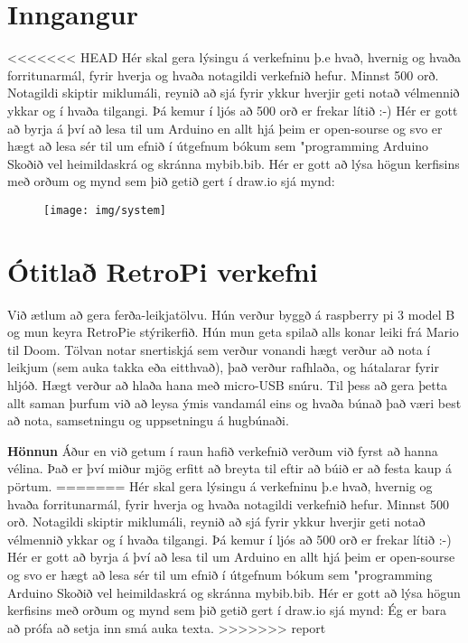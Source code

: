 \section{Inngangur}
<<<<<<< HEAD
Hér skal gera lýsingu á verkefninu þ.e hvað,  hvernig og  hvaða forritunarmál, fyrir hverja og hvaða notagildi verkefnið hefur. Minnst 500 orð. Notagildi skiptir miklumáli, reynið að sjá fyrir ykkur hverjir geti notað vélmennið ykkar og í hvaða tilgangi.  Þá kemur í ljós að 500 orð er frekar lítið :-) Hér er gott að byrja á því að lesa til um Arduino en allt hjá þeim er open-sourse og svo er hægt að lesa sér til um efnið í útgefnum bókum sem "programming Arduino \cite{monk} Skoðið vel heimildaskrá og skránna mybib.bib. Hér er gott að lýsa högun kerfisins með orðum og mynd sem þið getið gert í draw.io sjá mynd:

\begin{figure}[h]
\texttt{[image: img/system]}
\end{figure}
\section{Ótitlað RetroPi verkefni}
Við ætlum að gera ferða-leikjatölvu. Hún verður byggð á raspberry pi 3 model B og mun keyra RetroPie stýrikerfið. Hún mun geta spilað alls konar leiki frá Mario til Doom. Tölvan notar snertiskjá sem verður vonandi hægt verður að nota í leikjum (sem auka takka eða eitthvað), það verður rafhlaða, og hátalarar fyrir hljóð. Hægt verður að hlaða hana með micro-USB snúru. Til þess að gera þetta allt saman þurfum við að leysa ýmis vandamál eins og hvaða búnað það væri best að nota, samsetningu og uppsetningu á hugbúnaði.

\textbf{Hönnun}
Áður en við getum í raun hafið verkefnið verðum við fyrst að hanna vélina. Það er því miður mjög erfitt að breyta til eftir að búið er að festa kaup á pörtum.
=======
Hér skal gera lýsingu á verkefninu þ.e hvað,  hvernig og  hvaða forritunarmál, fyrir hverja og hvaða notagildi verkefnið hefur. Minnst 500 orð. Notagildi skiptir miklumáli, reynið að sjá fyrir ykkur hverjir geti notað vélmennið ykkar og í hvaða tilgangi.  Þá kemur í ljós að 500 orð er frekar lítið :-) Hér er gott að byrja á því að lesa til um Arduino en allt hjá þeim er open-sourse og svo er hægt að lesa sér til um efnið í útgefnum bókum sem "programming Arduino \cite{monk} Skoðið vel heimildaskrá og skránna mybib.bib. Hér er gott að lýsa högun kerfisins með orðum og mynd sem þið getið gert í draw.io sjá mynd: Ég er bara að prófa að setja inn smá auka texta.
>>>>>>> report
